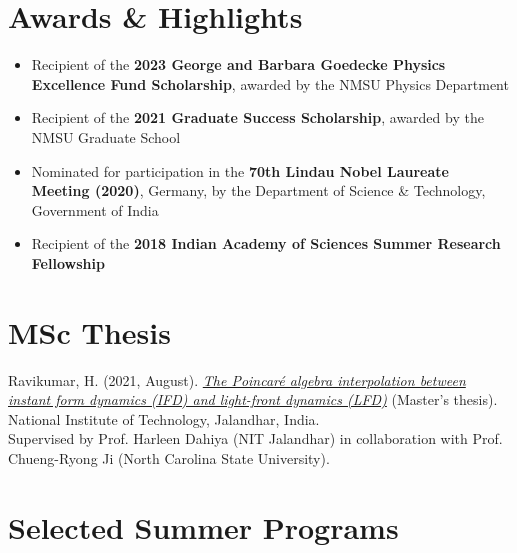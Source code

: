 \documentclass[11pt]{article}
\begin{document}
\section*{Awards \& Highlights}
\vspace{-0.3em}

\begin{itemize}
    \item Recipient of the \textbf{2023 George and Barbara Goedecke Physics Excellence Fund Scholarship}, awarded by the NMSU Physics Department

    \item Recipient of the \textbf{2021 Graduate Success Scholarship}, awarded by the NMSU Graduate School

    \item Nominated for participation in the \textbf{70th Lindau Nobel Laureate Meeting (2020)}, Germany, by the Department of Science \& Technology, Government of India

    \item Recipient of the \textbf{2018 Indian Academy of Sciences Summer Research Fellowship}
\end{itemize}

\section*{MSc Thesis}
\vspace{-0.3em}
Ravikumar, H. (2021, August). \href{https://hariprashad-ravikumar.github.io/publication_pdfs/The%20Poincare%CC%81%20Algebra%20Interpolation%20between%20Instant%20Form%20Dynamics%20(IFD)%20and%20Light%20Front%20Dynamics%20(LFD)%20(Master's%20thesis).pdf}{\textit{The Poincaré algebra interpolation between instant form dynamics (IFD) and light-front dynamics (LFD)}} (Master's thesis). National Institute of Technology, Jalandhar, India.  \\
Supervised by Prof. Harleen Dahiya (NIT Jalandhar) in collaboration with Prof. Chueng-Ryong Ji (North Carolina State University).

\section*{Selected Summer Programs}
\vspace{-0.3em}
\end{document}
